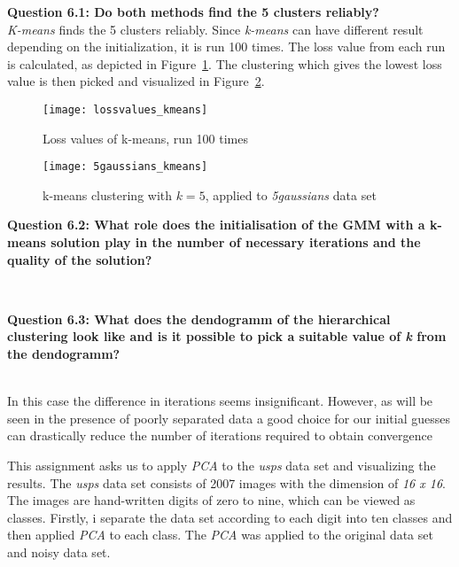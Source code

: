 {\raggedright \textbf{Question 6.1: Do both methods find the 5 clusters reliably?} \\
\textit{K-means} finds the 5 clusters reliably. Since \textit{k-means} can have different result depending on the initialization, it is run 100 times. The loss value from each run is calculated, as depicted in Figure~\ref{fig:lossvalues_kmeans}. The clustering which gives the lowest loss value is then picked and visualized in Figure~\ref{fig:5gaussians_kmeans}.

\begin{figure}[h!]
	\centering
	\texttt{[image: lossvalues\_kmeans]}
	\caption{Loss values of k-means, run 100 times}
	\label{fig:lossvalues_kmeans}
\end{figure}

\begin{figure}[h!]
	\centering
	\texttt{[image: 5gaussians\_kmeans]}
	\caption{k-means clustering with $k=5$, applied to \textit{5gaussians} data set}
	\label{fig:5gaussians_kmeans}
\end{figure}



{\raggedright \textbf{Question 6.2: What role does the initialisation of the GMM with a k-means solution play in the number of necessary iterations and the quality of the solution?}}\\

{\raggedright \textbf{Question 6.3: What does the dendogramm of the hierarchical clustering look like and is it possible to pick a suitable value of \textit{k} from the dendogramm?}}\\

In this case the difference in iterations
seems insignificant. However, as will be seen in the presence of poorly separated data a good choice for our
initial guesses can drastically reduce the number of iterations required to obtain convergence



This assignment asks us to apply \textit{PCA} to the \textit{usps} data set and visualizing the results. The \textit{usps} data set consists of 2007 images with the dimension of \textit{16 x 16}. The images are hand-written digits of zero to nine, which can be viewed as classes. Firstly, i separate the data set according to each digit into ten classes and then applied \textit{PCA} to each class. The \textit{PCA} was applied to the original data set and noisy data set.



}
